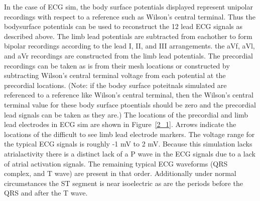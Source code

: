 \documentclass[12pt]{article}
\begin{document}
In the case of ECG sim, the body surface potentials displayed represent unipolar recordings with respect to a reference such as Wilson's central terminal. Thus the bodysurface potentials can be used to reconstruct the 12 lead ECG signals as described above. The limb lead potentials are subtracted from eachother to form bipolar recordings according to the lead I, II, and III arrangements. the aVf, aVl, and aVr recordings are constructed from the limb lead potentials. The precordial recordings can be taken as is from their mesh locations or constructed by subtracting Wilson's central terminal voltage from each potential at the precordial locations. (Note: if the bodsy surface poteitnals simulated are referenced to a reference like Wilson's central terminal, then the Wilson's central terminal value for these body surface ptoentials should be zero and the precordial lead signals can be taken as they are.) The locations of the precordial and limb lead electrodes in ECG sim are shown in Figure~\ref{2_1}. Arrows indicate the locations of the difficult to see limb lead electrode markers. The voltage range for the typical ECG signals is roughly -1 mV to 2 mV. Because this simulation lacks atrialactivity there is a distinct lack of a P wave in the ECG signals due to a lack of atrial activation signals. The remaining typical ECG waveforms (QRS complex, and T wave) are present in that order. Additionally under normal circumstances the ST segment is near isoelectric as are the periods before the QRS and after the T wave.
\end{document}

